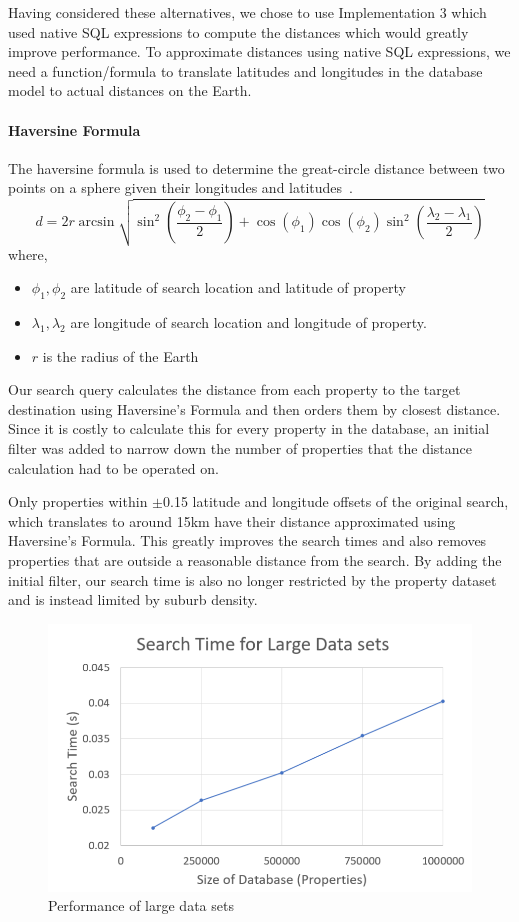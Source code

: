 Having considered these alternatives, we chose to use Implementation 3 which used
native SQL expressions to compute the distances which would greatly improve
performance. To approximate distances using native SQL expressions, we need a
function/formula to translate latitudes and longitudes in the database model to
actual distances on the Earth.

\paragraph{Haversine Formula}\label{eq:haversine}
The haversine formula is used to determine the great-circle distance between two
points on a sphere given their longitudes and
latitudes~\parencite{haversine-formula}.
\[
  d = 2r\arcsin{\sqrt{\sin^2\left(\frac{\phi_2 - \phi_1}{2}\right) +
      \cos(\phi_1)\cos(\phi_2)\sin^2\left(\frac{\lambda_2 - \lambda_1}{2}\right)}}
\]
where,
\begin{itemize}
  \item $\phi_1, \phi_2$ are latitude of search location and latitude of property
  \item $\lambda_1, \lambda_2$ are longitude of search location and longitude of
    property.
  \item $r$ is the radius of the Earth
\end{itemize}

Our search query calculates the distance from each property to the target
destination using Haversine's Formula and then orders them by closest distance.
Since it is costly to calculate this for every property in the database, an
initial filter was added to narrow down the number of properties that the
distance calculation had to be operated on.

Only properties within $\pm$0.15 latitude and longitude offsets of the original
search, which translates to around 15km have their distance approximated using
Haversine's Formula. This greatly improves the
search times and also removes properties that are outside a reasonable distance
from the search. By adding the initial filter, our search time is also no longer
restricted by the property dataset and is instead limited by suburb density.

\begin{figure}[!h]
  \includegraphics[width=\linewidth]{assets/performancetest.png}
  \caption{Performance of large data sets}
  \label{fig:performancetest}
\end{figure}

